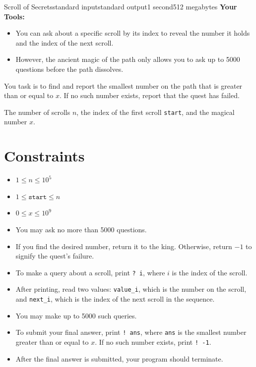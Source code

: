 \begin{problem}{Scroll of Secrets}{standard input}{standard output}{1 second}{512 megabytes}
\textbf{Your Tools:}
\begin{itemize}
    \item You can ask about a specific scroll by its index to reveal the number it holds and the index of the next scroll.
    \item However, the ancient magic of the path only allows you to ask up to 5000 questions before the path dissolves.
\end{itemize}

You task is to find and report the smallest number on the path that is greater than or equal to $x$. If no such number exists, report that the quest has failed.

\InputFile
The number of scrolls $n$, the index of the first scroll \texttt{start}, and the magical number $x$.

\section*{Constraints}

\begin{itemize}
    \item $1 \leq n \leq 10^5$
    \item $1 \leq \texttt{start} \leq n$
    \item $0 \leq x \leq 10^9$
    \item You may ask no more than 5000 questions.
\end{itemize}

\OutputFile
\begin{itemize}
    \item If you find the desired number, return it to the king. Otherwise, return $-1$ to signify the quest's failure.
\end{itemize}

\Interaction
\begin{itemize}
    \item To make a query about a scroll, print \texttt{? i}, where $i$ is the index of the scroll.
    \item After printing, read two values: \texttt{value\_i}, which is the number on the scroll, and \texttt{next\_i}, which is the index of the next scroll in the sequence.
    \item You may make up to 5000 such queries.
    \item To submit your final answer, print \texttt{! ans}, where \texttt{ans} is the smallest number greater than or equal to $x$. If no such number exists, print \texttt{! -1}.
    \item After the final answer is submitted, your program should terminate.
\end{itemize}


\end{problem}
